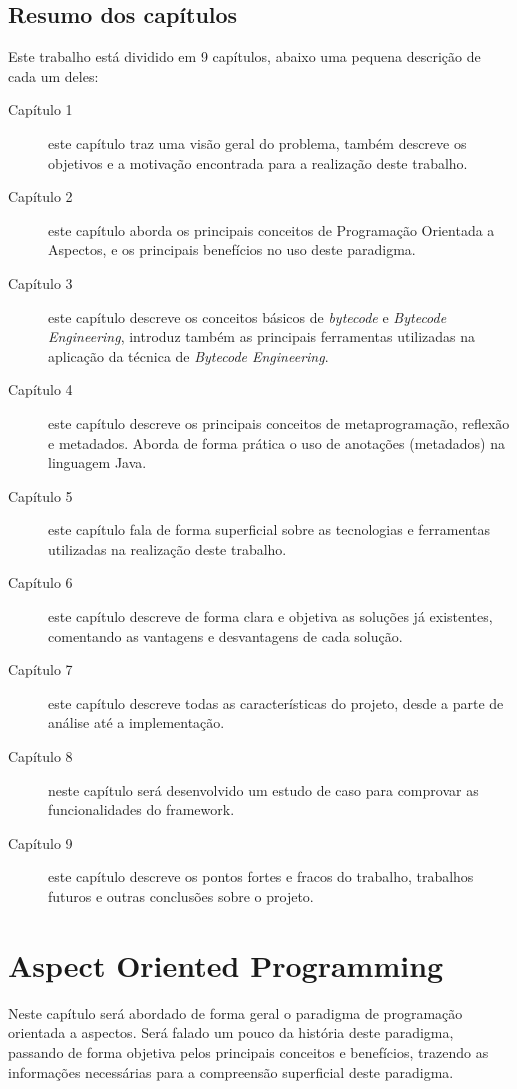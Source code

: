\documentclass[tc,openright]{iiufrgs}
\begin{document}
\section{Resumo dos capítulos}

Este trabalho está dividido em 9 capítulos, abaixo uma pequena descrição de cada um deles:

\begin{description}
\item [Capítulo 1] este capítulo traz uma visão geral do problema, também descreve os objetivos e a motivação encontrada para a realização deste trabalho.
\item [Capítulo 2] este capítulo aborda os principais conceitos de Programação Orientada a Aspectos, e os principais benefícios no uso deste paradigma.
\item [Capítulo 3] este capítulo descreve os conceitos básicos de \textit{bytecode} e \textit{Bytecode Engineering}, introduz também as principais ferramentas utilizadas na aplicação da técnica de \textit{Bytecode Engineering}.
\item [Capítulo 4] este capítulo descreve os principais conceitos de metaprogramação, reflexão e metadados. Aborda de forma prática o uso de anotações (metadados) na linguagem Java.
\item [Capítulo 5] este capítulo fala de forma superficial sobre as tecnologias e ferramentas utilizadas na realização deste trabalho.
\item [Capítulo 6] este capítulo descreve de forma clara e objetiva as soluções já existentes, comentando as vantagens e desvantagens de cada solução.
\item [Capítulo 7] este capítulo descreve todas as características do projeto, desde a parte de análise até a implementação.
\item [Capítulo 8] neste capítulo será desenvolvido um estudo de caso para comprovar as funcionalidades do framework.
\item [Capítulo 9] este capítulo descreve os pontos fortes e fracos do trabalho, trabalhos futuros e outras conclusões sobre o projeto. 
\end{description}
 
\chapter{Aspect Oriented Programming}
Neste capítulo será abordado de forma geral o paradigma de programação orientada a aspectos. Será falado um pouco da história deste paradigma, passando de forma objetiva pelos principais conceitos e benefícios, trazendo as informações necessárias para a compreensão superficial deste paradigma.
\end{document}
